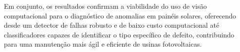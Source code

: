 \documentclass[a4paper,11pt]{article}
\begin{document}
Em conjunto, os resultados confirmam a viabilidade do uso de visão computacional para o diagnóstico de anomalias em painéis solares, oferecendo desde um detector de falhas robusto e de baixo custo computacional até classificadores capazes de identificar o tipo específico de defeito, contribuindo para uma manutenção mais ágil e eficiente de usinas fotovoltaicas.
\end{document}
